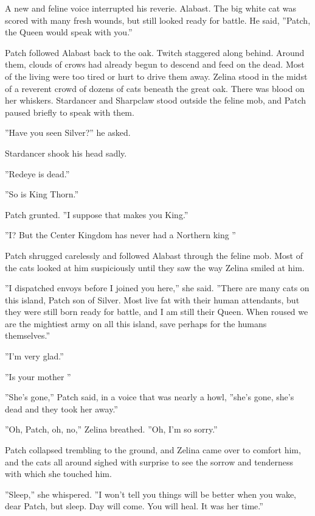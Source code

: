 \documentclass[11pt]{article}
\begin{document}
 A new and feline voice interrupted his reverie. Alabast. The big white cat was scored with many fresh wounds, but still looked ready for battle. He said, ''Patch, the Queen would speak with you.''\par
 Patch followed Alabast back to the oak. Twitch staggered along behind. Around them, clouds of crows had already begun to descend and feed on the dead. Most of the living were too tired or hurt to drive them away. Zelina stood in the midst of a reverent crowd of dozens of cats beneath the great oak. There was blood on her whiskers. Stardancer and Sharpclaw stood outside the feline mob, and Patch paused briefly to speak with them.\par
 ''Have you seen Silver?'' he asked.\par
 Stardancer shook his head sadly.\par
 ''Redeye is dead.''\par
 ''So is King Thorn.''\par
 Patch grunted. ''I suppose that makes you King.''\par
 ''I? But %
 the Center Kingdom has never had a Northern king %
''\par
 Patch shrugged carelessly and followed Alabast through the feline mob. Most of the cats looked at him suspiciously until they saw the way Zelina smiled at him.\par
 ''I dispatched envoys before I joined you here,'' she said. ''There are many cats on this island, Patch son of Silver. Most live fat with their human attendants, but they were still born ready for battle, and I am still their Queen. When roused we are the mightiest army on all this island, save perhaps for the humans themselves.''\par
 ''I'm very glad.''\par
 ''Is your mother %
''\par
 ''She's gone,'' Patch said, in a voice that was nearly a howl, ''she's gone, she's dead and they took her away.''\par
 ''Oh, Patch, oh, no,'' Zelina breathed. ''Oh, I'm so sorry.''\par
 Patch collapsed trembling to the ground, and Zelina came over to comfort him, and the cats all around sighed with surprise to see the sorrow and tenderness with which she touched him.\par
 ''Sleep,'' she whispered. ''I won't tell you things will be better when you wake, dear Patch, but sleep. Day will come. You will heal. It was her time.''\par
\end{document}
